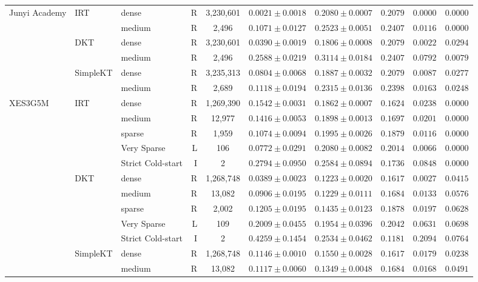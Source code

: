 \begin{table}[htbp]
{\begin{tabular}{lllrcccccc}
Junyi Academy & IRT & dense & R & 3,230,601 & $0.0021 \pm 0.0018$ & $0.2080 \pm 0.0007$ & $0.2079$ & $0.0000$ & $0.0000$ \\
 &  & medium & R & 2,496 & $0.1071 \pm 0.0127$ & $0.2523 \pm 0.0051$ & $0.2407$ & $0.0116$ & $0.0000$ \\
 & DKT & dense & R & 3,230,601 & $0.0390 \pm 0.0019$ & $0.1806 \pm 0.0008$ & $0.2079$ & $0.0022$ & $0.0294$ \\
 &  & medium & R & 2,496 & $0.2588 \pm 0.0219$ & $0.3114 \pm 0.0184$ & $0.2407$ & $0.0792$ & $0.0079$ \\
 & SimpleKT & dense & R & 3,235,313 & $0.0804 \pm 0.0068$ & $0.1887 \pm 0.0032$ & $0.2079$ & $0.0087$ & $0.0277$ \\
 &  & medium & R & 2,689 & $0.1118 \pm 0.0194$ & $0.2315 \pm 0.0136$ & $0.2398$ & $0.0163$ & $0.0248$ \\
\midrule
XES3G5M & IRT & dense & R & 1,269,390 & $0.1542 \pm 0.0031$ & $0.1862 \pm 0.0007$ & $0.1624$ & $0.0238$ & $0.0000$ \\
 &  & medium & R & 12,977 & $0.1416 \pm 0.0053$ & $0.1898 \pm 0.0013$ & $0.1697$ & $0.0201$ & $0.0000$ \\
 &  & sparse & R & 1,959 & $0.1074 \pm 0.0094$ & $0.1995 \pm 0.0026$ & $0.1879$ & $0.0116$ & $0.0000$ \\
 &  & Very Sparse & L & 106 & $0.0772 \pm 0.0291$ & $0.2080 \pm 0.0082$ & $0.2014$ & $0.0066$ & $0.0000$ \\
 &  & Strict Cold-start & I & 2 & $0.2794 \pm 0.0950$ & $0.2584 \pm 0.0894$ & $0.1736$ & $0.0848$ & $0.0000$ \\
 & DKT & dense & R & 1,268,748 & $0.0389 \pm 0.0023$ & $0.1223 \pm 0.0020$ & $0.1617$ & $0.0027$ & $0.0415$ \\
 &  & medium & R & 13,082 & $0.0906 \pm 0.0195$ & $0.1229 \pm 0.0111$ & $0.1684$ & $0.0133$ & $0.0576$ \\
 &  & sparse & R & 2,002 & $0.1205 \pm 0.0195$ & $0.1435 \pm 0.0123$ & $0.1878$ & $0.0197$ & $0.0628$ \\
 &  & Very Sparse & L & 109 & $0.2009 \pm 0.0455$ & $0.1954 \pm 0.0396$ & $0.2042$ & $0.0631$ & $0.0698$ \\
 &  & Strict Cold-start & I & 2 & $0.4259 \pm 0.1454$ & $0.2534 \pm 0.0462$ & $0.1181$ & $0.2094$ & $0.0764$ \\
 & SimpleKT & dense & R & 1,268,748 & $0.1146 \pm 0.0010$ & $0.1550 \pm 0.0028$ & $0.1617$ & $0.0179$ & $0.0238$ \\
 &  & medium & R & 13,082 & $0.1117 \pm 0.0060$ & $0.1349 \pm 0.0048$ & $0.1684$ & $0.0168$ & $0.0491$ \\

\end{tabular}}
\end{table}
